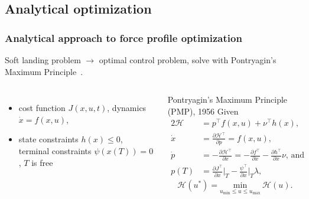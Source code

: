 \documentclass[aspectratio=169,9pt,xcolor=dvipsnames]{beamer}
\begin{document}
\subsection{Analytical optimization}
\begin{frame}
\frametitle{Analytical approach to force profile optimization}

Soft landing problem $\rightarrow$ optimal control problem, solve with Pontryagin's Maximum Principle~\cite{PMP}.

\begin{columns}[T]

\begin{itemize}
\item cost function $J(x,u,t)$, dynamics $\dot{x} = f(x,u)$,
\item state constraints $h(x) \leq 0$, terminal constraints $\psi(x(T)) = 0$, $T$ is free
\end{itemize}

\vspace{-0.2cm}
\begin{block}{Pontryagin's Maximum Principle (PMP), 1956}
\begingroup
\small
Given
\begin{alignat*}{2}
\mathcal{H} &= p^{\top}f(x,u) + \nu^{\top}h(x)\text{,}\\
\dot{x} &= \frac{\partial \mathcal{H}^{\top}}{\partial p} = f(x,u)\text{,}\\
\dot{p} &= -\frac{\partial \mathcal{H}^{\top}}{\partial x} = -\frac{\partial f^{\top}}{\partial x} - \frac{\partial h^{\top}}{\partial x}\nu\text{, and}\\
p(T) &= \frac{\partial J^{\top}}{\partial x}\bigg\rvert_T - \frac{\psi^{\top}}{\partial x}\bigg\rvert_T \lambda\text{,}
\end{alignat*}
\begin{equation*}
\mathcal{H}\left(u^*\right) = \underset{u_{\textrm{min}} \leq u \leq u_{\textrm{max}}}{\text{min}}\ \mathcal{H}\left(u\right)\text{.}
\end{equation*}
\endgroup
\end{block}


\end{columns}
\end{frame}
\end{document}
